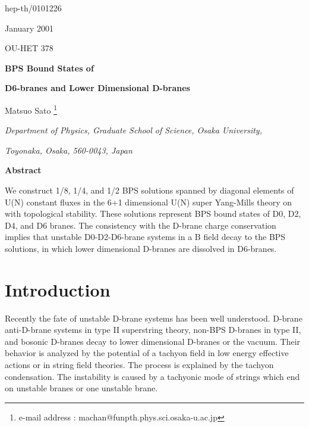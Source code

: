 \documentclass[a4paper,12pt]{article}
\begin{document}
\begin{flushright}
hep-th/0101226

January 2001

OU-HET 378
\end{flushright}

\begin{center}

\vspace{3cm}

\textbf{\large BPS Bound States of}

\textbf{\large D6-branes and Lower Dimensional D-branes }

\vspace{2cm}

Matsuo Sato \footnote{e-mail address : machan@funpth.phys.sci.osaka-u.ac.jp}

\vspace{1cm}

\textit{Department of Physics, Graduate School of Science, Osaka University, }

\textit{Toyonaka, Osaka, 560-0043, Japan}

\vspace{1cm}

\textbf{Abstract}

\end{center}
We construct 1/8, 1/4, and 1/2 BPS solutions spanned by diagonal elements of U(N) constant fluxes in the 6+1 dimensional U(N) super Yang-Mills theory on \coordHE{} with topological stability. These solutions represent BPS bound states of D0, D2, D4, and D6 branes. The consistency with the D-brane charge conservation implies that unstable D0-D2-D6-brane systems in a B field decay to the BPS solutions, in which lower dimensional D-branes are dissolved in  D6-branes.        

\newpage

\section{Introduction}
Recently the fate of unstable D-brane systems has been well understood. D-brane anti-D-brane systems in type II superstring theory, non-BPS D-branes in type II, and bosonic D-branes decay to lower dimensional D-branes or the vacuum. Their behavior is analyzed by the potential of a tachyon field in low energy effective actions or in string field theories. The process is explained by the tachyon condensation. The instability is caused by a tachyonic mode of strings which end on unstable branes or one unstable brane.
\end{document}
